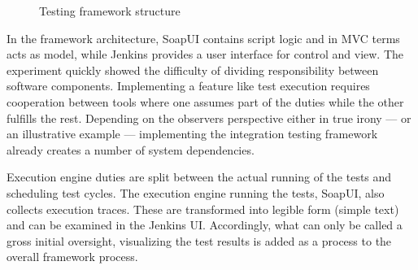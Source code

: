\documentclass[12pt,a4paper,oneside,pdftex]{report}
\begin{document}
{\begin{figure}[H]
\caption{Testing framework structure} \label{fig:structure}
\end{figure}

In the framework architecture, SoapUI contains script logic and in MVC terms acts as model, while Jenkins provides a user interface for control and view. The experiment quickly showed the difficulty of dividing responsibility between software components. Implementing a feature like test execution requires cooperation between tools where one assumes part of the duties while the other fulfills the rest. Depending on the observers perspective either in true irony --- or an illustrative example --- implementing the integration testing framework already creates a number of system dependencies.

Execution engine duties are split between the actual running of the tests and scheduling test cycles. The execution engine running the tests, SoapUI, also collects execution traces. These are transformed into legible form (simple text) and can be examined in the Jenkins UI. Accordingly, what can only be called a gross initial oversight, visualizing the test results is added as a process to the overall framework process.

}
\end{document}
